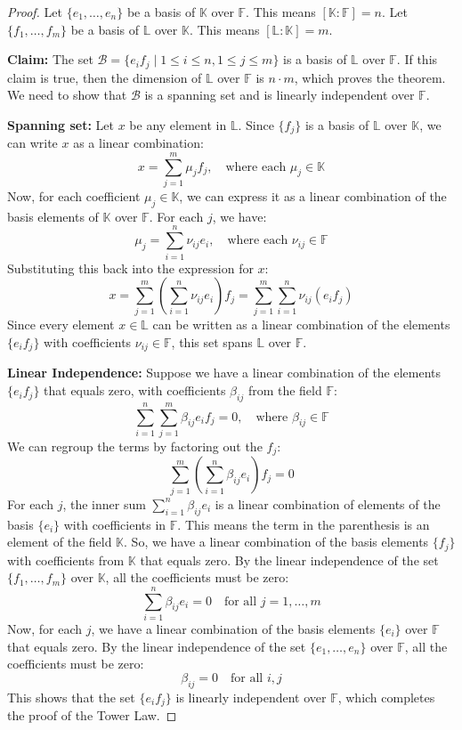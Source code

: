 \begin{proof}
Let $\{e_1, \dots, e_n\}$ be a basis of $\mathbb{K}$ over $\mathbb{F}$. This means $[\mathbb{K}:\mathbb{F}] = n$.
Let $\{f_1, \dots, f_m\}$ be a basis of $\mathbb{L}$ over $\mathbb{K}$. This means $[\mathbb{L}:\mathbb{K}] = m$.

\textbf{Claim:} The set $\mathcal{B} = \{e_i f_j \mid 1 \le i \le n, 1 \le j \le m\}$ is a basis of $\mathbb{L}$ over $\mathbb{F}$.
If this claim is true, then the dimension of $\mathbb{L}$ over $\mathbb{F}$ is $n \cdot m$, which proves the theorem. We need to show that $\mathcal{B}$ is a spanning set and is linearly independent over $\mathbb{F}$.

\textbf{Spanning set:}
Let $x$ be any element in $\mathbb{L}$. Since $\{f_j\}$ is a basis of $\mathbb{L}$ over $\mathbb{K}$, we can write $x$ as a linear combination:
\[ x = \sum_{j=1}^{m} \mu_j f_j, \quad \text{where each } \mu_j \in \mathbb{K} \]
Now, for each coefficient $\mu_j \in \mathbb{K}$, we can express it as a linear combination of the basis elements of $\mathbb{K}$ over $\mathbb{F}$. For each $j$, we have:
\[ \mu_j = \sum_{i=1}^{n} \nu_{ij} e_i, \quad \text{where each } \nu_{ij} \in \mathbb{F} \]
Substituting this back into the expression for $x$:
\[ x = \sum_{j=1}^{m} \left( \sum_{i=1}^{n} \nu_{ij} e_i \right) f_j = \sum_{j=1}^{m} \sum_{i=1}^{n} \nu_{ij} (e_i f_j) \]
Since every element $x \in \mathbb{L}$ can be written as a linear combination of the elements $\{e_i f_j\}$ with coefficients $\nu_{ij} \in \mathbb{F}$, this set spans $\mathbb{L}$ over $\mathbb{F}$.

\textbf{Linear Independence:}
Suppose we have a linear combination of the elements $\{e_i f_j\}$ that equals zero, with coefficients $\beta_{ij}$ from the field $\mathbb{F}$:
\[ \sum_{i=1}^{n} \sum_{j=1}^{m} \beta_{ij} e_i f_j = 0, \quad \text{where } \beta_{ij} \in \mathbb{F} \]
We can regroup the terms by factoring out the $f_j$:
\[ \sum_{j=1}^{m} \left( \sum_{i=1}^{n} \beta_{ij} e_i \right) f_j = 0 \]
For each $j$, the inner sum $\sum_{i=1}^{n} \beta_{ij} e_i$ is a linear combination of elements of the basis $\{e_i\}$ with coefficients in $\mathbb{F}$. This means the term in the parenthesis is an element of the field $\mathbb{K}$.
So, we have a linear combination of the basis elements $\{f_j\}$ with coefficients from $\mathbb{K}$ that equals zero.
By the linear independence of the set $\{f_1, \dots, f_m\}$ over $\mathbb{K}$, all the coefficients must be zero:
\[ \sum_{i=1}^{n} \beta_{ij} e_i = 0 \quad \text{for all } j = 1, \dots, m \]
Now, for each $j$, we have a linear combination of the basis elements $\{e_i\}$ over $\mathbb{F}$ that equals zero.
By the linear independence of the set $\{e_1, \dots, e_n\}$ over $\mathbb{F}$, all the coefficients must be zero:
\[ \beta_{ij} = 0 \quad \text{for all } i,j \]
This shows that the set $\{e_i f_j\}$ is linearly independent over $\mathbb{F}$, which completes the proof of the Tower Law. 
\end{proof}

